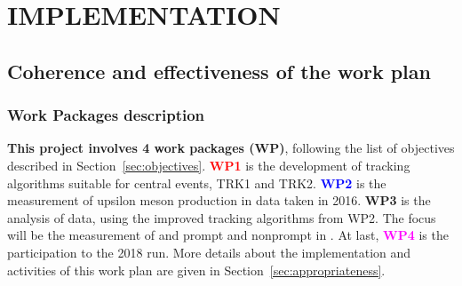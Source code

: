 \documentclass[a4paper,11pt]{article}
\newcommand{\ER}{ER\xspace}
\begin{document}
\section{IMPLEMENTATION}
\label{sec:implementation}

%            
           
\subsection{Coherence and effectiveness of the work plan} \label{sec:WP}


\subsubsection*{Work Packages description}

\textbf{This project involves 4 work packages (WP)}, following the list of objectives described in Section~\ref{sec:objectives}. \textbf{\textcolor{red}{WP1}} is the development of tracking algorithms suitable for central events, TRK1 and TRK2. \textbf{\textcolor{blue}{WP2}} is the measurement of upsilon meson production in \pPb data taken in 2016. \textbf{\textcolor{green!50!black}{WP3}} is the analysis of \pbpb data, using the improved tracking algorithms from WP2. The focus will be the measurement of \Dz and prompt and nonprompt \Jpsi in \pbpb. At last, \textbf{\textcolor{magenta}{WP4}} is the participation to the 2018 \PbPb run. More details about the implementation and activities of this work plan are given in Section~\ref{sec:appropriateness}.
\end{document}
